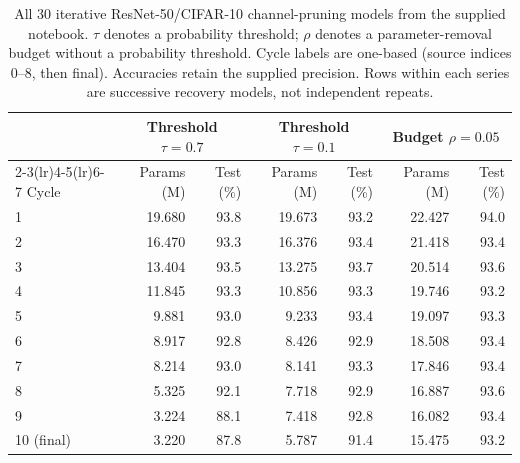 
\begin{table}[t]\centering\small
\caption{All 30 iterative ResNet-50/CIFAR-10 channel-pruning models from the supplied notebook. $\tau$ denotes a probability threshold; $\rho$ denotes a parameter-removal budget without a probability threshold. Cycle labels are one-based (source indices 0--8, then final). Accuracies retain the supplied precision. Rows within each series are successive recovery models, not independent repeats.}
\label{tab:resnet-notebook-trajectories}
\begin{tabular}{@{}lrrrrrr@{}}\toprule
& \multicolumn{2}{c}{Threshold $\tau=0.7$} & \multicolumn{2}{c}{Threshold $\tau=0.1$} & \multicolumn{2}{c}{Budget $\rho=0.05$} \\
\cmidrule(lr){2-3}\cmidrule(lr){4-5}\cmidrule(lr){6-7}
Cycle & Params (M) & Test (\%) & Params (M) & Test (\%) & Params (M) & Test (\%) \\\midrule
1 & 19.680 & 93.8 & 19.673 & 93.2 & 22.427 & 94.0 \\
2 & 16.470 & 93.3 & 16.376 & 93.4 & 21.418 & 93.4 \\
3 & 13.404 & 93.5 & 13.275 & 93.7 & 20.514 & 93.6 \\
4 & 11.845 & 93.3 & 10.856 & 93.3 & 19.746 & 93.2 \\
5 & 9.881 & 93.0 & 9.233 & 93.4 & 19.097 & 93.3 \\
6 & 8.917 & 92.8 & 8.426 & 92.9 & 18.508 & 93.4 \\
7 & 8.214 & 93.0 & 8.141 & 93.3 & 17.846 & 93.4 \\
8 & 5.325 & 92.1 & 7.718 & 92.9 & 16.887 & 93.6 \\
9 & 3.224 & 88.1 & 7.418 & 92.8 & 16.082 & 93.4 \\
10 (final) & 3.220 & 87.8 & 5.787 & 91.4 & 15.475 & 93.2 \\
\bottomrule\end{tabular}\end{table}
